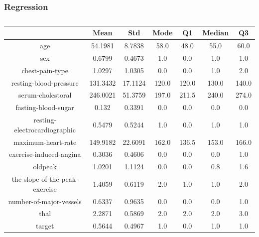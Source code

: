 \documentclass{classrep}
\begin{document}
{{            \subsubsection{Regression}
            \label{results:5-percent:regression} {
                \begin{table}[!htbp]
                    \centering
                    \begin{tabular}{|c|c|c|c|c|c|c|}
                        \hline
                        & Mean & Std & Mode & Q1 & Median & Q3 \\ \hline
                        age & 54.1981 & 8.7838 & 58.0 & 48.0 & 55.0 & 60.0 \\ \hline
                        sex & 0.6799 & 0.4673 & 1.0 & 0.0 & 1.0 & 1.0 \\ \hline
                        chest-pain-type & 1.0297 & 1.0305 & 0.0 & 0.0 & 1.0 & 2.0 \\ \hline
                        resting-blood-pressure & 131.3432 & 17.1124 & 120.0 & 120.0 & 130.0 & 140.0 \\ \hline
                        serum-cholestoral & 246.0021 & 51.3759 & 197.0 & 211.5 & 240.0 & 274.0 \\ \hline
                        fasting-blood-sugar & 0.132 & 0.3391 & 0.0 & 0.0 & 0.0 & 0.0 \\ \hline
                        resting-electrocardiographic & 0.5479 & 0.5244 & 1.0 & 0.0 & 1.0 & 1.0 \\ \hline
                        maximum-heart-rate & 149.9182 & 22.6091 & 162.0 & 136.5 & 153.0 & 166.0 \\ \hline
                        exercise-induced-angina & 0.3036 & 0.4606 & 0.0 & 0.0 & 0.0 & 1.0 \\ \hline
                        oldpeak & 1.0201 & 1.1124 & 0.0 & 0.0 & 0.8 & 1.6 \\ \hline
                        the-slope-of-the-peak-exercise & 1.4059 & 0.6119 & 2.0 & 1.0 & 1.0 & 2.0 \\ \hline
                        number-of-major-vessels & 0.6337 & 0.9635 & 0.0 & 0.0 & 0.0 & 1.0 \\ \hline
                        thal & 2.2871 & 0.5869 & 2.0 & 2.0 & 2.0 & 3.0 \\ \hline
                        target & 0.5644 & 0.4967 & 1.0 & 0.0 & 1.0 & 1.0 \\ \hline
                    \end{tabular}
                    \caption{}
                    \label{result_5_Regression}
                \end{table}
                \FloatBarrier

}}}
\end{document}
